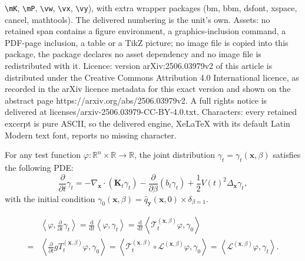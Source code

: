 \documentclass[10pt,a4paper]{amsart}
\newcommand{\Ls}{\mathcal{L}}
\newcommand{\dif}{{\mathrm{d}}}
\def\gT{{\mathcal{T}}}
\def\mK{{\bm{K}}}
\def\vx{{\bm{x}}}
\def\vy{{\bm{y}}}
\begin{document}
\texttt{\textbackslash mK}, \texttt{\textbackslash mP}, \texttt{\textbackslash vw}, \texttt{\textbackslash vx}, \texttt{\textbackslash vy}), with extra wrapper packages (bm, bbm, dsfont, xspace, cancel, mathtools). The delivered numbering is the unit's own. Assets: no retained span contains a figure environment, a graphics-inclusion command, a PDF-page inclusion, a table or a TikZ picture; no image file is copied into this package, the package declares no asset dependency and no image file is redistributed with it. Licence: version arXiv:2506.03979v2 of this article is distributed under the Creative Commons Attribution 4.0 International licence, as recorded in the arXiv licence metadata for this exact version and shown on the abstract page https://arxiv.org/abs/2506.03979v2. A full rights notice is delivered at licenses/arxiv-2506.03979-CC-BY-4.0.txt. Characters: every retained excerpt is pure ASCII, so the delivered engine, XeLaTeX with its default Latin Modern text font, reports no missing character.
\begin{proposition}
    For any test function $\varphi: \mathbb{R}^n \times \mathbb{R} \rightarrow \mathbb{R}$, the joint distribution $\gamma_t = \gamma_t(\vx, \beta)$ satisfies the following PDE:
    \begin{equation}
        \frac{\partial}{\partial t}\gamma_t = -\nabla_{\vx} \cdot \left(\mK_{t}\gamma_t\right) - \frac{\partial}{\partial \beta}\left(b_t \gamma_t\right)+\frac{1}{2}V(t)^2\Delta_{\vx}\gamma_t,
        \label{eqn: weak form of joint PDE}
    \end{equation}
    with the initial condition $\gamma_0(\vx,\beta) =\widehat{q}_{\vy}(\vx,0) \times \delta_{\beta = 1}$.
\end{proposition}

    \begin{equation}
    \label{eqn: intermediate derivaion of weak form for joint PDE}
    \begin{aligned}
    &\left\langle\varphi, \frac{\partial}{\partial t}\gamma_t\right\rangle = \frac{\dif}{\dif t}\left\langle\varphi,\gamma_t\right\rangle = \frac{\dif}{\dif t}\left\langle\gT^{(\vx,\beta)}_{t}\varphi, \gamma_0\right\rangle \\
    =& \left\langle\frac{\partial}{\partial t}gT^{(\vx,\beta)}_{t}\varphi, \gamma_0\right\rangle 
    = \left\langle\gT^{(\vx,\beta)}_{t}\circ\Ls^{(\vx,\beta)}\varphi, \gamma_0\right\rangle 
    = \left\langle\Ls^{(\vx,\beta)}\varphi, \gamma_t\right\rangle.  
    \end{aligned}    
    \end{equation}
\end{document}
